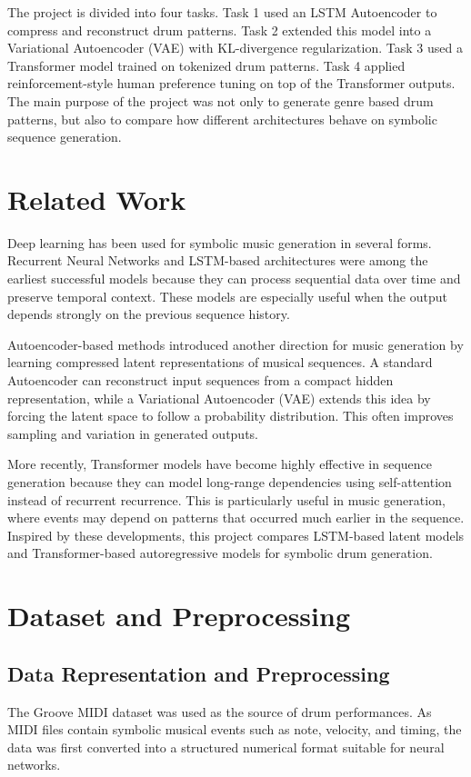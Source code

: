 \documentclass[conference]{IEEEtran}
\begin{document}
The project is divided into four tasks. Task 1 used an LSTM Autoencoder to compress and reconstruct drum patterns. Task 2 extended this model into a Variational Autoencoder (VAE) with KL-divergence regularization. Task 3 used a Transformer model trained on tokenized drum patterns. Task 4 applied reinforcement-style human preference tuning on top of the Transformer outputs. The main purpose of the project was not only to generate genre based drum patterns, but also to compare how different architectures behave on symbolic sequence generation.

\section{Related Work}
Deep learning has been used for symbolic music generation in several forms. Recurrent Neural Networks and LSTM-based architectures were among the earliest successful models because they can process sequential data over time and preserve temporal context. These models are especially useful when the output depends strongly on the previous sequence history.

Autoencoder-based methods introduced another direction for music generation by learning compressed latent representations of musical sequences. A standard Autoencoder can reconstruct input sequences from a compact hidden representation, while a Variational Autoencoder (VAE) extends this idea by forcing the latent space to follow a probability distribution. This often improves sampling and variation in generated outputs.

More recently, Transformer models have become highly effective in sequence generation because they can model long-range dependencies using self-attention instead of recurrent recurrence. This is particularly useful in music generation, where events may depend on patterns that occurred much earlier in the sequence. Inspired by these developments, this project compares LSTM-based latent models and Transformer-based autoregressive models for symbolic drum generation.

\section{Dataset and Preprocessing}

\subsection{Data Representation and Preprocessing}
The Groove MIDI dataset was used as the source of drum performances. As MIDI files contain symbolic musical events such as note, velocity, and timing, the data was first converted into a structured numerical format suitable for neural networks.
\end{document}
